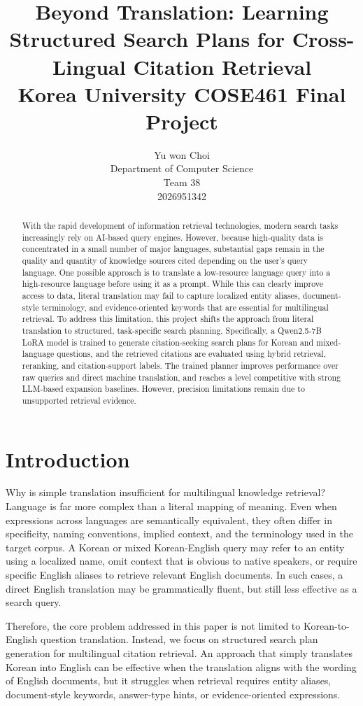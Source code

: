 \documentclass{article}
\title{
  Beyond Translation: Learning Structured Search Plans for Cross-Lingual Citation Retrieval\\
  \vspace{1em}
  \small{\normalfont Korea University COSE461 Final Project}
}
\author{
  Yu won Choi \\
  Department of Computer Science \\
  Team 38 \\
  2026951342
}
\begin{document}
\maketitle

\begin{abstract}
  With the rapid development of information retrieval technologies, modern search tasks increasingly rely on AI-based query engines.
  However, because high-quality data is concentrated in a small number of major languages, substantial gaps remain in the quality and quantity of knowledge sources cited depending on the user’s query language.
  One possible approach is to translate a low-resource language query into a high-resource language before using it as a prompt. While this can clearly improve access to data, literal translation may fail to capture localized entity aliases, document-style terminology, and evidence-oriented keywords that are essential for multilingual retrieval. To address this limitation, this project shifts the approach from literal translation to structured, task-specific search planning. Specifically, a Qwen2.5-7B LoRA model is trained to generate citation-seeking search plans for Korean and mixed-language questions, and the retrieved citations are evaluated using hybrid retrieval, reranking, and citation-support labels. The trained planner improves performance over raw queries and direct machine translation, and reaches a level competitive with strong LLM-based expansion baselines. However, precision limitations remain due to unsupported retrieval evidence.
\end{abstract}

\section{Introduction}
Why is simple translation insufficient for multilingual knowledge retrieval? Language is far more complex than a literal mapping of meaning. 
Even when expressions across languages are semantically equivalent, they often differ in specificity, naming conventions, implied context, and the terminology used in the target corpus. 
A Korean or mixed Korean-English query may refer to an entity using a localized name, omit context that is obvious to native speakers, or require specific English aliases to retrieve relevant English documents. 
In such cases, a direct English translation may be grammatically fluent, but still less effective as a search query.

Therefore, the core problem addressed in this paper is not limited to Korean-to-English question translation. 
Instead, we focus on structured search plan generation for multilingual citation retrieval. 
An approach that simply translates Korean into English can be effective when the translation aligns with the wording of English documents, but it struggles when retrieval requires entity aliases, document-style keywords, answer-type hints, or evidence-oriented expressions.
\end{document}
